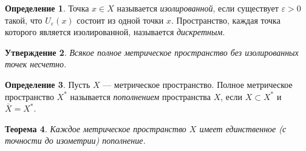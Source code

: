 \documentclass[12pt, titlepage, oneside]{amsbook}
\newtheorem{theorem}{Теорема}[chapter]
\newtheorem{claim}[theorem]{Утверждение}
\theoremstyle{definition}
\newtheorem{definition}[theorem]{Определение}
\theoremstyle{remark}
\begin{document}
\begin{definition}
	Точка $x\in X$ называется \emph{изолированной}, если существует $\varepsilon>0$ такой, что $U_{\varepsilon}(x)$ состоит из одной точки $x$. Пространство, каждая точка которого является изолированной, называется \emph{дискретным}.
\end{definition}

\begin{claim}
	\label{Pol4}
	Всякое полное метрическое пространство без изолированных точек несчетно.
\end{claim}

\begin{definition}
	Пусть $X$ --- метрическое пространство. Полное метрическое пространство $X^*$ называется \emph{пополнением} пространства $X$, если $X\subset X^*$ и $\bar{X}=X^*$.
\end{definition}

\begin{theorem}
	\label{Pol5}
	Каждое метрическое пространство $X$ имеет единственное (с точности до изометрии) пополнение.
\end{theorem}
\end{document}
